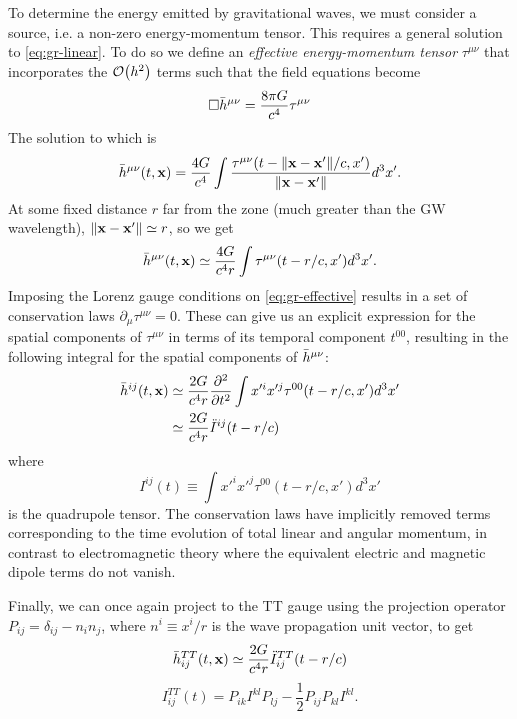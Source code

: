 To determine the energy emitted by gravitational waves, we must consider a source, i.e. a non-zero energy-momentum tensor.
This requires a general solution to \cref{eq:gr-linear}.
To do so we define an \textit{effective energy-momentum tensor} $\tau^{\mu\nu}$ that incorporates the $\order{h^2}$ terms such that the field equations become
\begin{equation}\label{eq:gr-effective}
	\Box \Bar{h}^{\mu\nu} = \frac{8\pi G}{c^4} \tau^{\mu\nu}
\end{equation}
The solution to which is
\begin{equation}
	\Bar{h}^{\mu\nu}(t, \mathbf{x}) = \frac{4G}{c^4} \int \frac{\tau^{\mu\nu}(t - \norm{\mathbf{x} - \mathbf{x'}}/c, x')}{\norm{\mathbf{x} - \mathbf{x'}}} d^3 x'.
\end{equation}
At some fixed distance $r$ far from the zone (much greater than the GW wavelength), $\norm{\mathbf{x} - \mathbf{x'}} \simeq r$, so we get
\begin{equation}
	\Bar{h}^{\mu\nu}(t, \mathbf{x}) \simeq \frac{4G}{c^4 r} \int \tau^{\mu\nu}(t - r/c, x') d^3 x'.
\end{equation}
Imposing the Lorenz gauge conditions on \cref{eq:gr-effective} results in a set of conservation laws $\partial_{\mu} \tau^{\mu\nu} = 0$.
These can give us an explicit expression for the spatial components of $\tau^{\mu\nu}$ in terms of its temporal component $t^{00}$, resulting in the following integral for the spatial components of $\Bar{h}^{\mu\nu}$:
\begin{align}
	\Bar{h}^{ij}(t, \mathbf{x}) &\simeq \frac{2G}{c^4 r} \frac{\partial^2}{\partial t^2} \int x'^{i} x'^{j} \tau^{00}(t - r/c, x') d^3 x'\\
	&\simeq \frac{2G}{c^4 r} \ddot{I}^{ij}(t-r/c)
\end{align}
where
\begin{equation}
	I^{ij}(t) \equiv \int x'^{i} x'^{j} \tau^{00}(t - r/c, x') d^3 x'
\end{equation}
is the quadrupole tensor.
The conservation laws have implicitly removed terms corresponding to the time evolution of total linear and angular momentum, in contrast to electromagnetic theory where the equivalent electric and magnetic dipole terms do not vanish.

Finally, we can once again project to the TT gauge using the projection operator $P_{ij} = \delta_{ij} - n_i n_j$, where $n^i \equiv x^i / r$ is the wave propagation unit vector, to get
\begin{equation}\label{eq:gr-h(t)}
	\Bar{h}^{TT}_{ij}(t, \mathbf{x}) \simeq \frac{2G}{c^4 r} \ddot{I}^{TT}_{ij}(t-r/c)
\end{equation}
\begin{equation}\label{eq:gr-quadrupole}
	I^{TT}_{ij}(t) = P_{ik} I^{kl} P_{lj} - \frac{1}{2} P_{ij} P_{kl} I^{kl}.
\end{equation}


